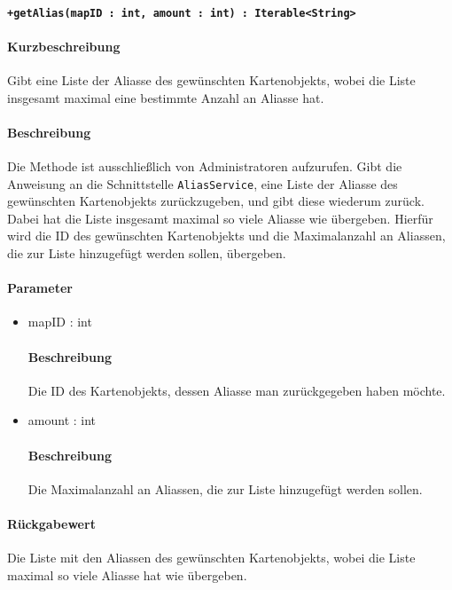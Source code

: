 \paragraph*{\texttt{+getAlias(mapID : int, amount : int) : Iterable<String>}}%
\paragraph*{Kurzbeschreibung}
Gibt eine Liste der Aliasse des gewünschten Kartenobjekts, wobei die Liste insgesamt maximal eine bestimmte Anzahl an Aliasse hat.
\paragraph*{Beschreibung}
Die Methode ist ausschließlich von Administratoren aufzurufen.
Gibt die Anweisung an die Schnittstelle \texttt{AliasService}, eine Liste der Aliasse des gewünschten Kartenobjekts zurückzugeben, und gibt diese wiederum zurück.
Dabei hat die Liste insgesamt maximal so viele Aliasse wie übergeben.
Hierfür wird die ID des gewünschten Kartenobjekts und die Maximalanzahl an Aliassen, die zur Liste hinzugefügt werden sollen, übergeben.
\paragraph*{Parameter}
\begin{itemize}
    \item mapID : int
    		\paragraph*{Beschreibung}
    		Die ID des Kartenobjekts, dessen Aliasse man zurückgegeben haben möchte.
    	\item amount : int
    		\paragraph*{Beschreibung}
    		Die Maximalanzahl an Aliassen, die zur Liste hinzugefügt werden sollen.
\end{itemize}
\paragraph*{Rückgabewert}
Die Liste mit den Aliassen des gewünschten Kartenobjekts, wobei die Liste maximal so viele Aliasse hat wie übergeben.
